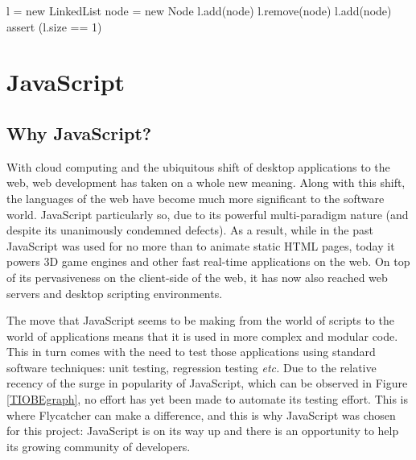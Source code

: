 \begin{code}
l = new LinkedList   
node = new Node
l.add(node)
l.remove(node)
l.add(node)
assert (l.size == 1)
\end{code}




\section{JavaScript}
\label{overalljs}
\subsection{Why JavaScript?}

With cloud computing and the ubiquitous shift of desktop applications to the web, web development has taken on a whole new meaning. Along with this shift, the languages of the web have become much more significant to the software world. JavaScript particularly so, due to its powerful multi-paradigm nature (and despite its unanimously condemned defects). As a result, while in the past JavaScript was used for no more than to animate static HTML pages, today it powers 3D game engines and other fast real-time applications on the web. On top of its pervasiveness on the client-side of the web, it has now also reached web servers and desktop scripting environments.

The move that JavaScript seems to be making from the world of scripts to the world of applications means that it is used in more complex and modular code. This in turn comes with the need to test those applications using standard software techniques: unit testing, regression testing \emph{etc.} Due to the relative recency of the surge in popularity of JavaScript, which can be observed in Figure \ref{TIOBEgraph}, no effort has yet been made to automate its testing effort. This is where \textsf{Flycatcher} can make a difference, and this is why JavaScript was chosen for this project: JavaScript is on its way up and there is an opportunity to help its growing community of developers.

